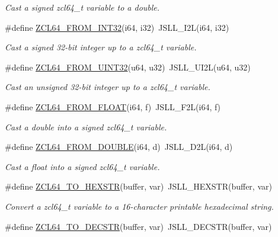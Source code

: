 \begin{DoxyCompactItemize}
\begin{DoxyCompactList}\small\item\em Cast a signed zcl64\-\_\-t variable to a {\ttfamily double}. \end{DoxyCompactList}\item 
\#define \hyperlink{group__zcl__64_gafe6c7cf76cbba5ac7fb5329fd0801278}{Z\-C\-L64\-\_\-\-F\-R\-O\-M\-\_\-\-I\-N\-T32}(i64, i32)~J\-S\-L\-L\-\_\-\-I2\-L(i64, i32)
\begin{DoxyCompactList}\small\item\em Cast a signed 32-\/bit integer up to a zcl64\-\_\-t variable. \end{DoxyCompactList}\item 
\#define \hyperlink{group__zcl__64_gaae113edcbf898afca39e88d742c27f8d}{Z\-C\-L64\-\_\-\-F\-R\-O\-M\-\_\-\-U\-I\-N\-T32}(u64, u32)~J\-S\-L\-L\-\_\-\-U\-I2\-L(u64, u32)
\begin{DoxyCompactList}\small\item\em Cast an unsigned 32-\/bit integer up to a zcl64\-\_\-t variable. \end{DoxyCompactList}\item 
\#define \hyperlink{group__zcl__64_gaae1ff05a93a54da4e06bbca682d2c548}{Z\-C\-L64\-\_\-\-F\-R\-O\-M\-\_\-\-F\-L\-O\-A\-T}(i64, f)~J\-S\-L\-L\-\_\-\-F2\-L(i64, f)
\begin{DoxyCompactList}\small\item\em Cast a {\ttfamily double} into a signed zcl64\-\_\-t variable. \end{DoxyCompactList}\item 
\#define \hyperlink{group__zcl__64_ga1899e4fdd99e7f07bf5044997a40e248}{Z\-C\-L64\-\_\-\-F\-R\-O\-M\-\_\-\-D\-O\-U\-B\-L\-E}(i64, d)~J\-S\-L\-L\-\_\-\-D2\-L(i64, d)
\begin{DoxyCompactList}\small\item\em Cast a {\ttfamily float} into a signed zcl64\-\_\-t variable. \end{DoxyCompactList}\item 
\#define \hyperlink{group__zcl__64_ga24b0de907d96815f51558733e99792d3}{Z\-C\-L64\-\_\-\-T\-O\-\_\-\-H\-E\-X\-S\-T\-R}(buffer, var)~J\-S\-L\-L\-\_\-\-H\-E\-X\-S\-T\-R(buffer, var)
\begin{DoxyCompactList}\small\item\em Convert a zcl64\-\_\-t variable to a 16-\/character printable hexadecimal string. \end{DoxyCompactList}\item 
\#define \hyperlink{group__zcl__64_gae93bf21431b64dcc3d9bcd67296ff0ed}{Z\-C\-L64\-\_\-\-T\-O\-\_\-\-D\-E\-C\-S\-T\-R}(buffer, var)~J\-S\-L\-L\-\_\-\-D\-E\-C\-S\-T\-R(buffer, var)

\end{DoxyCompactItemize}
